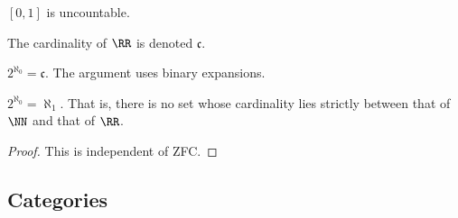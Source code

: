 \begin{theorem}
$[0,1]$ is uncountable.
\end{theorem}

The cardinality of $\RR$ is denoted $\mathfrak{c}$.

\begin{remark}
$2^{\aleph_0} = \mathfrak{c}$. The argument uses binary expansions.
\end{remark}

\begin{proposition}
$2^{\aleph_0} = \aleph_1$. That is, there is no set whose cardinality lies strictly between that of $\NN$ and that of $\RR$.
\end{proposition}

\begin{proof}
This is independent of ZFC.
\end{proof}

\subsection{Categories}


